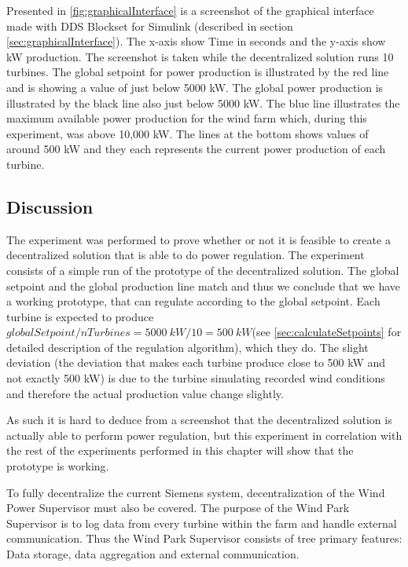 Presented in \cref{fig:graphicalInterface} is a screenshot of the graphical interface made with DDS Blockset for Simulink (described in section \cref{sec:graphicalInterface}). The x-axis show Time in seconds and the y-axis show kW production. The screenshot is taken while the decentralized solution runs 10 turbines.
The global setpoint for power production is illustrated by the red line and is showing a value of just below 5000 kW. The global power production is illustrated by the black line also just below 5000 kW.
The blue line illustrates the maximum available power production for the wind farm which, during this experiment, was above 10,000 kW. The lines at the bottom shows values of around 500 kW and they each represents the current power production of each turbine.

\subsection{Discussion}\label{feas:discussion}
The experiment was performed to prove whether or not it is feasible to create a decentralized solution that is able to do power regulation. The experiment consists of a simple run of the prototype of the decentralized solution. The global setpoint and the global production line match and thus we conclude that we have a working prototype, that can regulate according to the global setpoint. Each turbine is expected to produce $globalSetpoint/nTurbines=5000~kW/10=500~kW$(see \cref{sec:calculateSetpoints} for detailed description of the regulation algorithm), which they do. The slight deviation (the deviation that makes each turbine produce close to 500 kW and not exactly 500 kW) is due to the turbine simulating recorded wind conditions and therefore the actual production value change slightly.

As such it is hard to deduce from a screenshot that the decentralized solution is actually able to perform power regulation, but this experiment in correlation with the rest of the experiments performed in this chapter will show that the prototype is working.

To fully decentralize the current Siemens system, decentralization of the Wind Power Supervisor must also be covered. The purpose of the Wind Park Supervisor is to log data from every turbine within the farm and handle external communication. Thus the Wind Park Supervisor consists of tree primary features: Data storage, data aggregation and external communication. 

